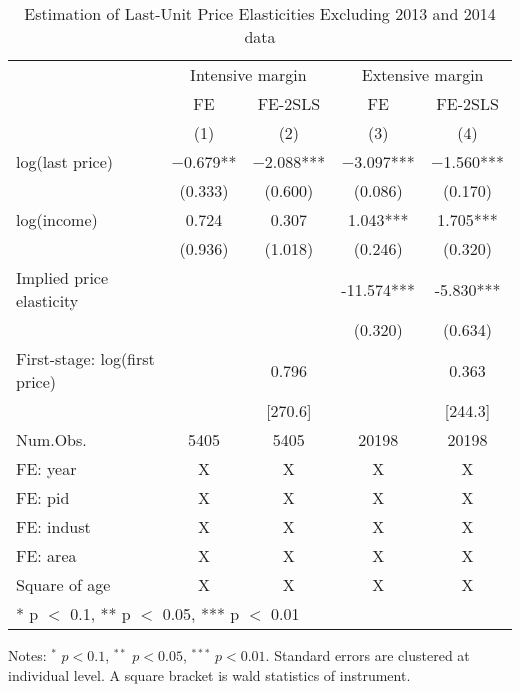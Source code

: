 \documentclass[
  11pt,
  a4paper,
]{article}
\begin{document}
\begin{table}

\caption{\label{tab:WoAnnoucementElasticity}Estimation of Last-Unit Price Elasticities Excluding 2013 and 2014 data}
\centering
\fontsize{9}{11}\selectfont
\begin{threeparttable}
\begin{tabular}[t]{lcccc}
\toprule
\multicolumn{1}{c}{ } & \multicolumn{2}{c}{Intensive margin} & \multicolumn{2}{c}{Extensive margin} \\
\cmidrule(l{3pt}r{3pt}){2-3} \cmidrule(l{3pt}r{3pt}){4-5}
\multicolumn{1}{c}{ } & \multicolumn{1}{c}{FE} & \multicolumn{1}{c}{FE-2SLS} & \multicolumn{1}{c}{FE} & \multicolumn{1}{c}{FE-2SLS} \\
\cmidrule(l{3pt}r{3pt}){2-2} \cmidrule(l{3pt}r{3pt}){3-3} \cmidrule(l{3pt}r{3pt}){4-4} \cmidrule(l{3pt}r{3pt}){5-5}
  & (1) & (2) & (3) & (4)\\
\midrule
log(last price) & \num{-0.679}** & \num{-2.088}*** & \num{-3.097}*** & \num{-1.560}***\\
 & (\num{0.333}) & (\num{0.600}) & (\num{0.086}) & (\num{0.170})\\
log(income) & \num{0.724} & \num{0.307} & \num{1.043}*** & \num{1.705}***\\
 & (\num{0.936}) & (\num{1.018}) & (\num{0.246}) & (\num{0.320})\\
\midrule
Implied price elasticity &  &  & -11.574*** & -5.830***\\
 &  &  & (0.320) & (0.634)\\
First-stage: log(first price) &  & 0.796 &  & 0.363\\
 &  & [270.6] &  & [244.3]\\
Num.Obs. & \num{5405} & \num{5405} & \num{20198} & \num{20198}\\
FE: year & X & X & X & X\\
FE: pid & X & X & X & X\\
FE: indust & X & X & X & X\\
FE: area & X & X & X & X\\
Square of age & X & X & X & X\\
\bottomrule
\multicolumn{5}{l}{\rule{0pt}{1em}* p $<$ 0.1, ** p $<$ 0.05, *** p $<$ 0.01}\\
\end{tabular}
\begin{tablenotes}
\item Notes: $^{*}$ $p < 0.1$, $^{**}$ $p < 0.05$, $^{***}$ $p < 0.01$. Standard errors are clustered at individual level. A square bracket is wald statistics of instrument.
\end{tablenotes}
\end{threeparttable}
\end{table}
\end{document}

